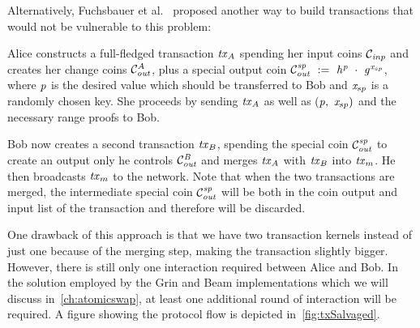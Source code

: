 Alternatively, Fuchsbauer et al.~\cite{fuchsbauer2019aggregate} proposed another way to build transactions that would not be vulnerable to this problem:
\begin{asparaenum}
    \item Alice constructs a full-fledged transaction $\mathit{tx}_A$ spending her input coins $\mathcal{C}_{\mathit{inp}}$ and creates her change coins $\mathcal{C}_{\mathit{out}}^A$, plus a special output coin $\mathcal{C}_{\mathit{out}}^{\mathit{sp}} ~:=~ \mathit{h}^{\mathit{p}} ~\cdot~ \mathit{g}^{\mathit{x}_{sp}}$, where $\mathit{p}$ is the desired value which should be transferred to Bob and $\mathit{x}_{sp}$ is a randomly chosen key.
    She proceeds by sending $\mathit{tx}_A$ as well as $(\mathit{p} ,~ \mathit{x}_{sp})$ and the necessary range proofs to Bob.
    \item Bob now creates a second transaction $\mathit{tx}_B$, spending the special coin $\mathcal{C}_{\mathit{out}}^{\mathit{sp}}$ to create an output only he controls $\mathcal{C}_{\mathit{out}}^{\mathit{B}}$ and merges $\mathit{tx}_A$ with $\mathit{tx}_B$ into $\mathit{tx}_m$. He then broadcasts $\mathit{tx}_m$ to the network.
    Note that when the two transactions are merged, the intermediate special coin $\mathcal{C}_{\mathit{out}}^{\mathit{sp}}$ will be both in the coin output and input list of the transaction and therefore will be discarded.
\end{asparaenum}
One drawback of this approach is that we have two transaction kernels instead of just one because of the merging step, making the transaction slightly bigger.
However, there is still only one interaction required between Alice and Bob.
In the solution employed by the Grin and Beam implementations which we will discuss in~\cref{ch:atomicswap}, at least one additional round of interaction will be required.
A figure showing the protocol flow is depicted in~\cref{fig:txSalvaged}.

